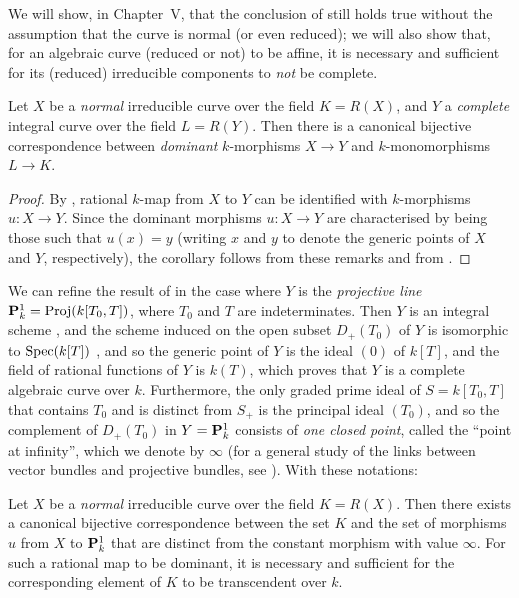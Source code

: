
\begin{remark}[7.4.12]
\label{II.7.4.12}
We will show, in Chapter~V, that the conclusion of  still holds true without the assumption that the curve is normal (or even reduced);
we will also show that, for an algebraic curve (reduced or not) to be affine, it is necessary and sufficient for its (reduced) irreducible components to \emph{not} be complete.
\end{remark}

\begin{corollary}[7.4.13]
\label{II.7.4.13}
Let $X$ be a \emph{normal} irreducible curve over the field $K=R(X)$, and $Y$ a \emph{complete} integral curve over the field $L=R(Y)$.
Then there is a canonical bijective correspondence between \emph{dominant} $k$-morphisms $X\to Y$ and $k$-monomorphisms $L\to K$.
\end{corollary}

\begin{proof}
By , rational $k$-map from $X$ to $Y$ can be identified with $k$-morphisms $u:X\to Y$.
Since the dominant morphisms $u:X\to Y$ are characterised by being those such that $u(x)=y$ (writing $x$ and $y$ to denote the generic points of $X$ and $Y$, respectively), the corollary follows from these remarks and from .
\end{proof}

\begin{env}[7.4.14]
\label{II.7.4.14}
We can refine the result of  in the case where $Y$ is the \emph{projective line} $\mathbf{P}_k^1=\operatorname{Proj}(k[T_0,T])$, where $T_0$ and $T$ are indeterminates.
Then $Y$ is an integral scheme , and the scheme induced on the open subset $D_+(T_0)$ of $Y$ is isomorphic to $\operatorname{Spec}(k[T])$ , and so the generic point of $Y$ is the ideal $(0)$ of $k[T]$, and the field of rational functions of $Y$ is $k(T)$, which proves that $Y$ is a complete algebraic curve over $k$.
Furthermore, the only graded prime ideal of $S=k[T_0,T]$ that contains $T_0$ and is distinct from $S_+$ is the principal ideal $(T_0)$, and so the complement of $D_+(T_0)$ in $Y=\mathbf{P}_k^1$ consists of \emph{one closed point}, called the ``point at infinity'', which we denote by $\infty$ (for a general study of the links between vector bundles and projective bundles, see ).
With these notations:
\end{env}

\begin{corollary}[7.4.15]
\label{II.7.4.15}
Let $X$ be a \emph{normal} irreducible curve over the field $K=R(X)$.
Then there exists a canonical bijective correspondence between the set $K$ and the set of morphisms $u$ from $X$ to $\mathbf{P}_k^1$ that are distinct from the constant morphism with value $\infty$.
For such a rational map to be dominant, it is necessary and sufficient for the corresponding element of $K$ to be transcendent over $k$.
\end{corollary}

